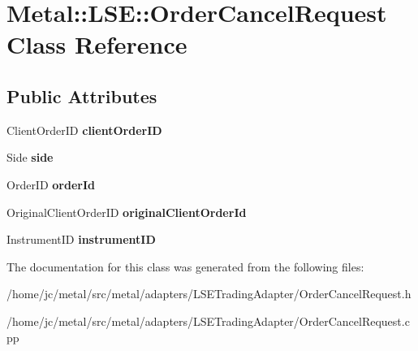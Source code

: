 \hypertarget{classMetal_1_1LSE_1_1OrderCancelRequest}{}\section{Metal\+:\+:L\+S\+E\+:\+:Order\+Cancel\+Request Class Reference}
\label{classMetal_1_1LSE_1_1OrderCancelRequest}
\subsection*{Public Attributes}
\begin{DoxyCompactItemize}
\item 
\hypertarget{classMetal_1_1LSE_1_1OrderCancelRequest_a17cf42a99f70826442cd78668a20e460}{}Client\+Order\+I\+D {\bfseries client\+Order\+I\+D}\label{classMetal_1_1LSE_1_1OrderCancelRequest_a17cf42a99f70826442cd78668a20e460}

\item 
\hypertarget{classMetal_1_1LSE_1_1OrderCancelRequest_a8147911f2234bdb988adfb6f43b7aaca}{}Side {\bfseries side}\label{classMetal_1_1LSE_1_1OrderCancelRequest_a8147911f2234bdb988adfb6f43b7aaca}

\item 
\hypertarget{classMetal_1_1LSE_1_1OrderCancelRequest_ad35bf5f0e86e582724e8e6868028b976}{}Order\+I\+D {\bfseries order\+Id}\label{classMetal_1_1LSE_1_1OrderCancelRequest_ad35bf5f0e86e582724e8e6868028b976}

\item 
\hypertarget{classMetal_1_1LSE_1_1OrderCancelRequest_a96b6730c82337371d5de0354566a616c}{}Original\+Client\+Order\+I\+D {\bfseries original\+Client\+Order\+Id}\label{classMetal_1_1LSE_1_1OrderCancelRequest_a96b6730c82337371d5de0354566a616c}

\item 
\hypertarget{classMetal_1_1LSE_1_1OrderCancelRequest_a25a35022d18a4c0826199bbb6950ad16}{}Instrument\+I\+D {\bfseries instrument\+I\+D}\label{classMetal_1_1LSE_1_1OrderCancelRequest_a25a35022d18a4c0826199bbb6950ad16}

\end{DoxyCompactItemize}


The documentation for this class was generated from the following files\+:\begin{DoxyCompactItemize}
\item 
/home/jc/metal/src/metal/adapters/\+L\+S\+E\+Trading\+Adapter/Order\+Cancel\+Request.\+h\item 
/home/jc/metal/src/metal/adapters/\+L\+S\+E\+Trading\+Adapter/Order\+Cancel\+Request.\+cpp\end{DoxyCompactItemize}
